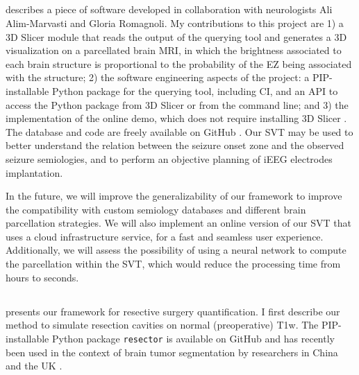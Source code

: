 \subsection{}

 describes a piece of software developed in collaboration with neurologists Ali Alim-Marvasti and Gloria Romagnoli.
My contributions to this project are
1) a 3D Slicer module \cite{fedorov_3d_2012} that reads the output of the querying tool and generates a 3D visualization on a parcellated brain \ac{MRI}, in which the brightness associated to each brain structure is proportional to the probability of the \ac{EZ} being associated with the structure;
2) the software engineering aspects of the project: a \ac{PIP}-installable Python package for the querying tool, including \ac{CI}, and an \ac{API} to access the Python package from 3D Slicer or from the command line; and
3) the implementation of the online demo, which does not require installing 3D Slicer%
.
The database and code are freely available on GitHub%
\fnurl{\svtgithub}.
Our \ac{SVT} may be used to better understand the relation between the seizure onset zone and the observed seizure semiologies, and to perform an objective planning of \ac{iEEG} electrodes implantation.

In the future, we will improve the generalizability of our framework to improve the compatibility with custom semiology databases and different brain parcellation strategies.
We will also implement an online version of our \ac{SVT} that uses a cloud infrastructure service, for a fast and seamless user experience.
Additionally, we will assess the possibility of using a neural network to compute the parcellation within the \ac{SVT}, which would reduce the processing time from hours to seconds.


\subsection{}

 presents our framework for resective surgery quantification.
I first describe our method to simulate resection cavities on normal (preoperative) \ac{T1w}.
The \ac{PIP}-installable Python package \texttt{resector} is available on GitHub%
and has recently been used in the context of brain tumor segmentation by researchers in China and the UK \cite{zhang_self-supervised_2021}.


